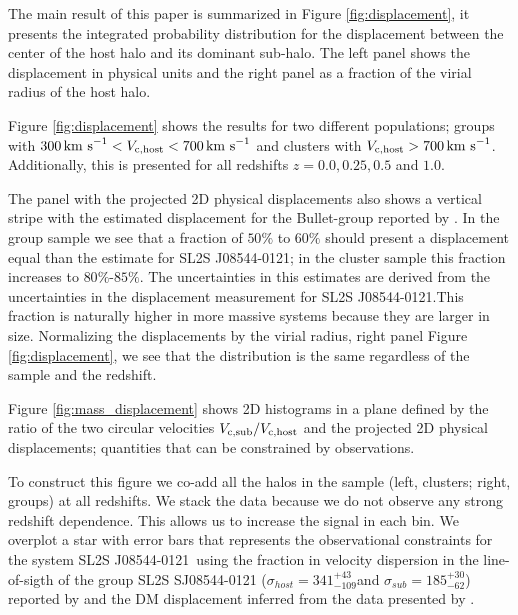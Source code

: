 \documentclass{emulateapj}
\newcommand{\kms}{{\ifmmode{{\mathrm{\,km\ s}^{-1}}}\else{\,km~s$^{-1}$}\fi}}
\newcommand{\bullg}{SL2S J08544-0121}
\begin{document}
The main result of this paper is summarized in Figure
\ref{fig:displacement}, it presents the integrated
probability distribution for the displacement between the center of
the host halo and its dominant sub-halo. The left panel shows
the displacement in physical units and the right panel as a fraction
of the virial radius of the host halo. 

Figure \ref{fig:displacement} shows the results for two different
populations; groups with $300\kms < V_{\rm c, host}<700\kms$ and
clusters with $V_{\rm c,host}>700\kms$. Additionally, this is
presented for all redshifts $z=0.0, 0.25, 0.5$ and $1.0$. 

The panel with the projected 2D physical displacements also shows a
vertical stripe with the estimated displacement for the Bullet-group reported by
\cite{Gastaldello}. In the group sample we see that a fraction of
$50\%$ to $60\%$  should present a displacement equal than the
estimate for \bullg; in the cluster sample this fraction increases to
$80\%$-$85\%$. The uncertainties in this estimates are derived from
the uncertainties in the displacement measurement for \bullg.This
fraction is naturally higher in more massive systems because they are
larger in size. Normalizing the displacements by the virial radius,
right panel Figure \ref{fig:displacement}, we see that the
distribution is the same regardless of the sample and the redshift.

Figure \ref{fig:mass_displacement} shows 2D histograms in a plane
defined by the ratio of the two circular velocities $V_{\rm c,
  sub}/V_{\rm c, host}$ and the projected 2D physical displacements;
quantities that can be constrained by observations. 

To construct this figure we co-add all the halos in the sample (left,
clusters; right, groups) at all redshifts. We stack the data because
we do not observe any strong redshift dependence. This allows
us to increase the signal in each bin. We overplot a star with error
bars that represents the observational constraints for the system
\bullg\ using the fraction in velocity dispersion in the line-of-sigth
of the group SL2S SJ08544-0121 ($\sigma_{host}=341^{+43}_{-109}$\kms and
$\sigma_{sub}=185^{+30}_{-62}$\kms) reported by
\citet{2013A&A...552A..80M} and the DM displacement inferred from the
data presented by \cite{Gastaldello}. 
\end{document}
